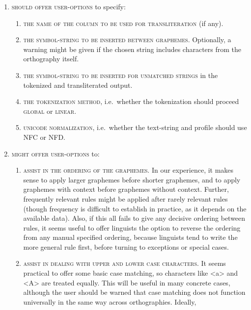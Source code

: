 \begin{enumerate}
	\def\labelenumi{\arabic{enumi}.} 
	\item \textsc{should offer user-options} to specify:
	\begin{enumerate}
		\def\labelenumii{C\arabic{enumii}.} 
		\item \textsc{the name of the column to be used for transliteration} (if any). 
		\item \textsc{the symbol-string to be inserted between graphemes.} Optionally,
        a warning might be given if the chosen string includes characters from
        the orthography itself. 
		\item \textsc{the symbol-string to be inserted for unmatched strings} in the
        tokenized and transliterated output. 
		\item \textsc{the tokenization method}, i.e.~whether the tokenization should
        proceed \textsc{global} or \textsc{linear}. 
		\item \textsc{unicode normalization}, i.e.~whether the text-string and profile
        should use \textsc{NFC} or \textsc{NFD}. 
    \end{enumerate}
	\item \textsc{might offer user-options }to:
	\begin{enumerate}
		\def\labelenumii{C\arabic{enumii}.} \setcounter{enumii}{5} 
		\item \textsc{assist in the ordering of the graphemes.} In our experience, it
        makes sense to apply larger graphemes before shorter graphemes, and to
        apply graphemes with context before graphemes without context. Further,
        frequently relevant rules might be applied after rarely relevant rules
        (though frequency is difficult to establish in practice, as it depends
        on the available data). Also, if this all fails to give any decisive
        ordering between rules, it seems useful to offer linguists the option to
        reverse the ordering from any manual specified ordering, because
        linguists tend to write the more general rule first, before turning to
        exceptions or special cases. 
		\item \textsc{assist in dealing with upper and lower case characters.} It
        seems practical to offer some basic case matching, so characters like
        <a> and <A> are treated equally. This will be useful in many concrete
        cases, although the user should be warned that case matching does not
        function universally in the same way across orthographies. Ideally,

\end{enumerate}
\end{enumerate}
